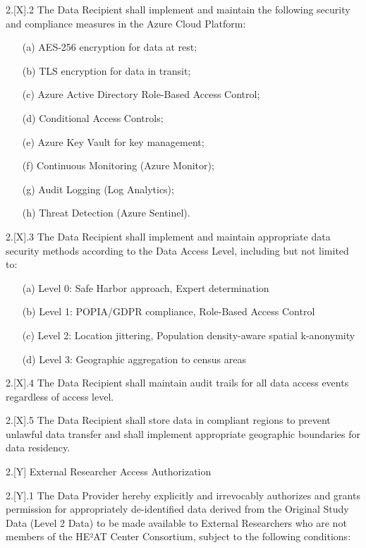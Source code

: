 \documentclass[12pt,letterpaper]{article}
\newcommand{\added}[1]{\textcolor{addcolor}{#1}}
\begin{document}
\added{2.[X].2 The Data Recipient shall implement and maintain the following security and compliance measures in the Azure Cloud Platform:
\begin{enumerate}
\item[(a)] AES-256 encryption for data at rest;
\item[(b)] TLS encryption for data in transit;
\item[(c)] Azure Active Directory Role-Based Access Control;
\item[(d)] Conditional Access Controls;
\item[(e)] Azure Key Vault for key management;
\item[(f)] Continuous Monitoring (Azure Monitor);
\item[(g)] Audit Logging (Log Analytics);
\item[(h)] Threat Detection (Azure Sentinel).
\end{enumerate}}

\added{2.[X].3 The Data Recipient shall implement and maintain appropriate data security methods according to the Data Access Level, including but not limited to:
\begin{enumerate}
\item[(a)] Level 0: Safe Harbor approach, Expert determination
\item[(b)] Level 1: POPIA/GDPR compliance, Role-Based Access Control
\item[(c)] Level 2: Location jittering, Population density-aware spatial k-anonymity
\item[(d)] Level 3: Geographic aggregation to census areas
\end{enumerate}}

\added{2.[X].4 The Data Recipient shall maintain audit trails for all data access events regardless of access level.}

\added{2.[X].5 The Data Recipient shall store data in compliant regions to prevent unlawful data transfer and shall implement appropriate geographic boundaries for data residency.}

\added{2.[Y] External Researcher Access Authorization}

\added{2.[Y].1 The Data Provider hereby explicitly and irrevocably authorizes and grants permission for appropriately de-identified data derived from the Original Study Data (Level 2 Data) to be made available to External Researchers who are not members of the HE²AT Center Consortium, subject to the following conditions:}
\end{document}
